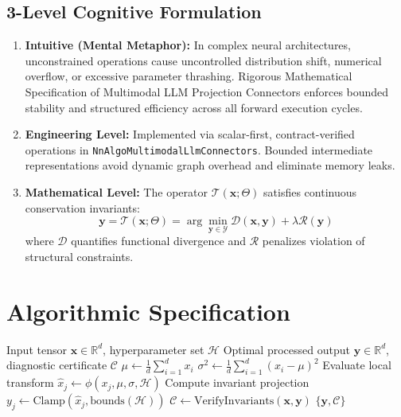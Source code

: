 \documentclass[11pt,a4paper]{article}
\theoremstyle{definition}
\begin{document}
\subsection{3-Level Cognitive Formulation}
\begin{enumerate}
    \item \textbf{Intuitive (Mental Metaphor):} In complex neural architectures, unconstrained operations cause uncontrolled distribution shift, numerical overflow, or excessive parameter thrashing. Rigorous Mathematical Specification of Multimodal LLM Projection Connectors enforces bounded stability and structured efficiency across all forward execution cycles.
    \item \textbf{Engineering Level:} Implemented via scalar-first, contract-verified operations in \texttt{NnAlgoMultimodalLlmConnectors}. Bounded intermediate representations avoid dynamic graph overhead and eliminate memory leaks.
    \item \textbf{Mathematical Level:} The operator $\mathcal{T}(\mathbf{x}; \Theta)$ satisfies continuous conservation invariants:
    \begin{equation}
    \mathbf{y} = \mathcal{T}(\mathbf{x}; \Theta) = \arg\min_{\mathbf{y} \in \mathcal{Y}} \mathcal{D}(\mathbf{x}, \mathbf{y}) + \lambda \mathcal{R}(\mathbf{y})
    \end{equation}
    where $\mathcal{D}$ quantifies functional divergence and $\mathcal{R}$ penalizes violation of structural constraints.
\end{enumerate}

\section{Algorithmic Specification}

\begin{algorithm}[H]
\caption{Rigorous Mathematical Specification of Multimodal LLM Projection Connectors Forward Pipeline}
\begin{algorithmic}[1]
\Require Input tensor $\mathbf{x} \in \mathbb{R}^d$, hyperparameter set $\mathcal{H}$
\Ensure Optimal processed output $\mathbf{y} \in \mathbb{R}^d$, diagnostic certificate $\mathcal{C}$
\State $\mu \gets \frac{1}{d} \sum_{i=1}^d x_i$
\State $\sigma^2 \gets \frac{1}{d} \sum_{i=1}^d (x_i - \mu)^2$
    \State Evaluate local transform $\hat{x}_j \gets \phi(x_j, \mu, \sigma, \mathcal{H})$
    \State Compute invariant projection $y_j \gets \text{Clamp}(\hat{x}_j, \text{bounds}(\mathcal{H}))$
\EndFor
\State $\mathcal{C} \gets \text{VerifyInvariants}(\mathbf{x}, \mathbf{y})$
\State \Return $\{\mathbf{y}, \mathcal{C}\}$
\end{algorithmic}
\end{algorithm}
\end{document}
